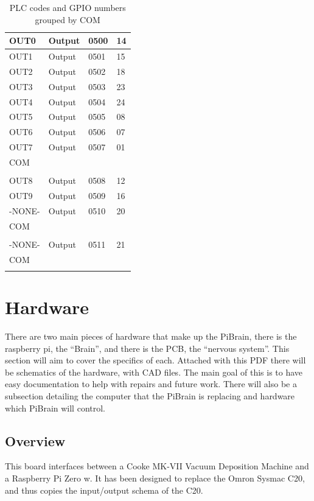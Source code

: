 \documentclass[titlepage]{article}
\begin{document}
\begin{table}[h!]
\begin{tabular}{|l|l|l|l|}
    OUT0 & Output & 0500 & 14 \\ \hline
    OUT1 & Output & 0501 & 15 \\ \hline
    OUT2 & Output & 0502 & 18 \\ \hline
    OUT3 & Output & 0503 & 23 \\ \hline
    OUT4 & Output & 0504 & 24 \\ \hline
    OUT5 & Output & 0505 & 08 \\ \hline
    OUT6 & Output & 0506 & 07 \\ \hline
    OUT7 & Output & 0507 & 01 \\ \hline
    COM & & & \\ \hline
    & & & \\ \hline
    OUT8 & Output & 0508 & 12 \\ \hline
    OUT9 & Output & 0509 & 16 \\ \hline
    -NONE- & Output & 0510 & 20 \\ \hline
    COM & & & \\ \hline
    & & & \\ \hline
    -NONE- & Output & 0511 & 21 \\ \hline
    COM & & & \\ \hline
    & & & \\ \hline
    \end{tabular}
\caption{PLC codes and GPIO numbers grouped by COM}
\label{table:pin_def_t}
\end{table} 

\section{Hardware}
There are two main pieces of hardware that make up the PiBrain, there is the raspberry pi, the ``Brain'', and there is the PCB, the ``nervous system''. This section will aim to cover the specifics of each. Attached with this PDF there will be schematics of the hardware, with CAD files. The main goal of this is to have easy documentation to help with repairs and future work. There will also be a subsection detailing the computer that the PiBrain is replacing and hardware which PiBrain will control.

\subsection{Overview}
\label{section:hardware_over}
This board interfaces between a Cooke MK-VII Vacuum Deposition Machine and a Raspberry Pi Zero w. It has been designed to replace the Omron Sysmac C20, and thus copies the input/output schema of the C20.\\
\end{document}
